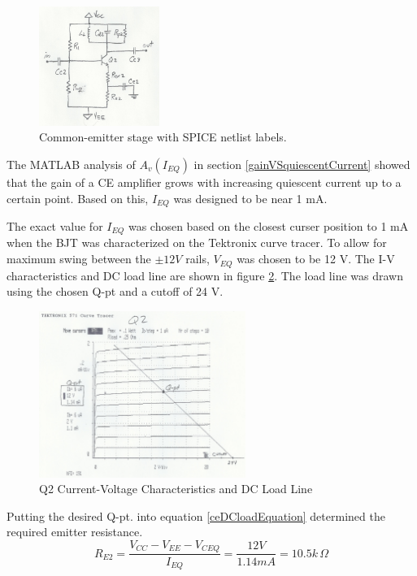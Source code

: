 \documentclass[titlepage, letterpaper, 10.5pt]{article}
\begin{document}
\begin{figure}[ht]
	\centering
	\includegraphics[width=0.35\textwidth]
		{figures/commonEmitterStage}
	\caption{
		Common-emitter stage with SPICE netlist labels.
	}
	\label{commonEmitterStage}
\end{figure}

The MATLAB analysis of $A_{v}(I_{EQ})$ in section
\ref{gainVSquiescentCurrent} showed that the gain of a CE amplifier
grows with increasing quiescent current up to a certain point. Based
on this, $I_{EQ}$ was designed to be near 1 mA.

The exact value for $I_{EQ}$ was chosen based on the closest curser
position to 1 mA when the BJT was characterized on the Tektronix
curve tracer. To allow for maximum swing between the $\pm12V$ rails,
$V_{EQ}$ was chosen to be 12 V. The I-V characteristics and DC load
line are shown in figure \ref{q2Characteristics}. The load line was
drawn using the chosen Q-pt and a cutoff of 24 V.

\begin{figure}[ht]
	\centering
	\includegraphics[width=0.6\textwidth]
		{measurements/q2Characteristics}
	\caption{
		Q2 Current-Voltage Characteristics and DC Load Line
	}
	\label{q2Characteristics}
\end{figure}

Putting the desired Q-pt. into equation \ref{ceDCloadEquation}
determined the required emitter resistance.
\begin{equation*}
R_{E2}=\frac{V_{CC}-V_{EE}-V_{CEQ}}{I_{EQ}}=\frac{12V}{1.14mA}
=10.5k\,\Omega
\end{equation*}
\end{document}
